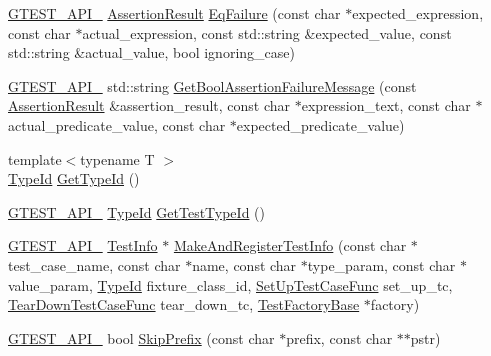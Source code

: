 \begin{DoxyCompactItemize}
\item 
\hyperlink{gtest-port_8h_aa73be6f0ba4a7456180a94904ce17790}{G\+T\+E\+S\+T\+\_\+\+A\+P\+I\+\_\+} \hyperlink{classtesting_1_1_assertion_result}{Assertion\+Result} \hyperlink{namespacetesting_1_1internal_a08725846ff184d3e79bcf5be4df19157}{Eq\+Failure} (const char $\ast$expected\+\_\+expression, const char $\ast$actual\+\_\+expression, const std\+::string \&expected\+\_\+value, const std\+::string \&actual\+\_\+value, bool ignoring\+\_\+case)
\item 
\hyperlink{gtest-port_8h_aa73be6f0ba4a7456180a94904ce17790}{G\+T\+E\+S\+T\+\_\+\+A\+P\+I\+\_\+} std\+::string \hyperlink{namespacetesting_1_1internal_a5fd6e5dc9eb20ab3c3a80e24d89dfac6}{Get\+Bool\+Assertion\+Failure\+Message} (const \hyperlink{classtesting_1_1_assertion_result}{Assertion\+Result} \&assertion\+\_\+result, const char $\ast$expression\+\_\+text, const char $\ast$actual\+\_\+predicate\+\_\+value, const char $\ast$expected\+\_\+predicate\+\_\+value)
\item 
{\footnotesize template$<$typename T $>$ }\\\hyperlink{namespacetesting_1_1internal_ab1114197d3c657d8b7f8e0c5caa12d00}{Type\+Id} \hyperlink{namespacetesting_1_1internal_a6b108e56fdc68ea937ffb3759fb55ab0}{Get\+Type\+Id} ()
\item 
\hyperlink{gtest-port_8h_aa73be6f0ba4a7456180a94904ce17790}{G\+T\+E\+S\+T\+\_\+\+A\+P\+I\+\_\+} \hyperlink{namespacetesting_1_1internal_ab1114197d3c657d8b7f8e0c5caa12d00}{Type\+Id} \hyperlink{namespacetesting_1_1internal_ad0d66d56ead224263cd100c1d6bfc562}{Get\+Test\+Type\+Id} ()
\item 
\hyperlink{gtest-port_8h_aa73be6f0ba4a7456180a94904ce17790}{G\+T\+E\+S\+T\+\_\+\+A\+P\+I\+\_\+} \hyperlink{classtesting_1_1_test_info}{Test\+Info} $\ast$ \hyperlink{namespacetesting_1_1internal_a8280dfb4f7c8d5b71184f91f4725f759}{Make\+And\+Register\+Test\+Info} (const char $\ast$test\+\_\+case\+\_\+name, const char $\ast$name, const char $\ast$type\+\_\+param, const char $\ast$value\+\_\+param, \hyperlink{namespacetesting_1_1internal_ab1114197d3c657d8b7f8e0c5caa12d00}{Type\+Id} fixture\+\_\+class\+\_\+id, \hyperlink{namespacetesting_1_1internal_a30037044c0b57cdd647c7e2e97cb2cff}{Set\+Up\+Test\+Case\+Func} set\+\_\+up\+\_\+tc, \hyperlink{namespacetesting_1_1internal_a085e31321d0d029c04d2a79234f60c1a}{Tear\+Down\+Test\+Case\+Func} tear\+\_\+down\+\_\+tc, \hyperlink{classtesting_1_1internal_1_1_test_factory_base}{Test\+Factory\+Base} $\ast$factory)
\item 
\hyperlink{gtest-port_8h_aa73be6f0ba4a7456180a94904ce17790}{G\+T\+E\+S\+T\+\_\+\+A\+P\+I\+\_\+} bool \hyperlink{namespacetesting_1_1internal_a244d9a3765727306b597b8992ab84036}{Skip\+Prefix} (const char $\ast$prefix, const char $\ast$$\ast$pstr)
$$
\end{DoxyCompactItemize}

